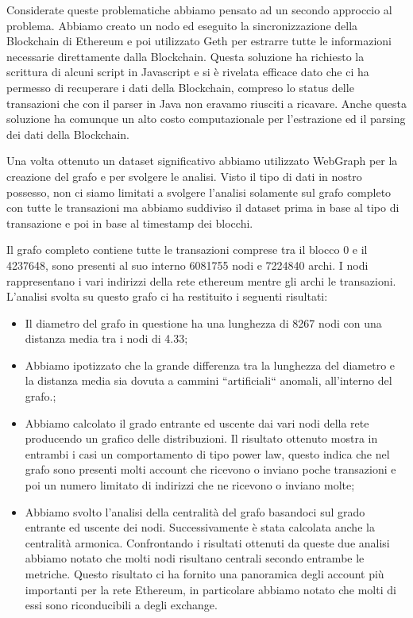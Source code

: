 \documentclass[12pt]{report}
\begin{document}
Considerate queste problematiche abbiamo pensato ad un secondo approccio al problema.
Abbiamo creato un nodo ed eseguito la sincronizzazione della Blockchain di Ethereum e poi utilizzato Geth \cite{goEthereum} per estrarre tutte le informazioni necessarie direttamente dalla Blockchain.
Questa soluzione ha richiesto la scrittura di alcuni script in Javascript e si è rivelata efficace dato che ci ha permesso di recuperare i dati della Blockchain, compreso lo status delle transazioni che con il parser in Java non eravamo riusciti a ricavare.
\newline
Anche questa soluzione ha comunque un alto costo computazionale per l'estrazione ed il parsing dei dati della Blockchain.

Una volta ottenuto un dataset significativo abbiamo utilizzato WebGraph \cite{WebGraph} per la creazione del grafo e per svolgere le analisi.
Visto il tipo di dati in nostro possesso, non ci siamo limitati a svolgere l'analisi solamente sul grafo completo con tutte le transazioni ma abbiamo suddiviso il dataset prima in base al tipo di transazione e poi in base al timestamp dei blocchi.

Il grafo completo contiene tutte le transazioni comprese tra il blocco 0 e il 4237648, sono presenti al suo interno 6081755 nodi e 7224840 archi.
I nodi rappresentano i vari indirizzi della rete ethereum mentre gli archi le transazioni.
L'analisi svolta su questo grafo ci ha restituito i seguenti risultati:
\begin{itemize}
    \item Il diametro del grafo in questione ha una lunghezza di 8267 nodi con una distanza media tra i nodi di 4.33;
    \item Abbiamo ipotizzato che la grande differenza tra la lunghezza del diametro e la distanza media sia dovuta a cammini ``artificiali`` anomali, all'interno del grafo.;
    \item Abbiamo calcolato il grado entrante ed uscente dai vari nodi della rete producendo un grafico delle distribuzioni.
    Il risultato ottenuto mostra in entrambi i casi un comportamento di tipo power law, questo indica che nel grafo sono presenti molti account che ricevono o inviano poche transazioni e poi un numero limitato di indirizzi che ne ricevono o inviano molte;
    \item Abbiamo svolto l'analisi della centralità del grafo basandoci sul grado entrante ed uscente dei nodi. Successivamente è stata calcolata anche la centralità armonica.
    Confrontando i risultati ottenuti da queste due analisi abbiamo notato che molti nodi risultano centrali secondo entrambe le metriche.
    Questo risultato ci ha fornito una panoramica degli account più importanti per la rete Ethereum, in particolare abbiamo notato che molti di essi sono riconducibili a degli exchange.
\end{itemize}
\end{document}
